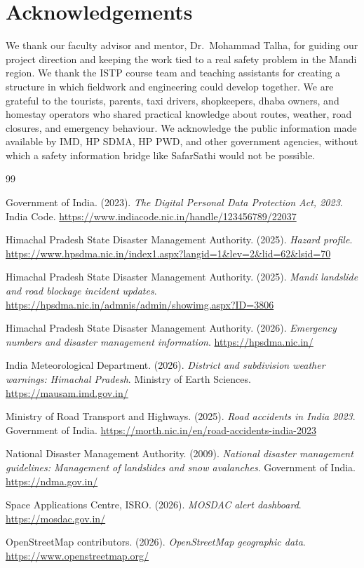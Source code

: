 \documentclass[12pt,a4paper]{article}
\begin{document}
\section*{Acknowledgements}

We thank our faculty advisor and mentor, Dr.\ Mohammad Talha, for guiding our project direction and keeping the work tied to a real safety problem in the Mandi region. We thank the ISTP course team and teaching assistants for creating a structure in which fieldwork and engineering could develop together. We are grateful to the tourists, parents, taxi drivers, shopkeepers, dhaba owners, and homestay operators who shared practical knowledge about routes, weather, road closures, and emergency behaviour. We acknowledge the public information made available by IMD, HP SDMA, HP PWD, and other government agencies, without which a safety information bridge like SafarSathi would not be possible.

\newpage
\begin{thebibliography}{99}

Government of India. (2023). \textit{The Digital Personal Data Protection Act, 2023}. India Code. \url{https://www.indiacode.nic.in/handle/123456789/22037}

Himachal Pradesh State Disaster Management Authority. (2025). \textit{Hazard profile}. \url{https://www.hpsdma.nic.in/index1.aspx?langid=1&lev=2&lid=62&lsid=70}

Himachal Pradesh State Disaster Management Authority. (2025). \textit{Mandi landslide and road blockage incident updates}. \url{https://hpsdma.nic.in/admnis/admin/showimg.aspx?ID=3806}

Himachal Pradesh State Disaster Management Authority. (2026). \textit{Emergency numbers and disaster management information}. \url{https://hpsdma.nic.in/}

India Meteorological Department. (2026). \textit{District and subdivision weather warnings: Himachal Pradesh}. Ministry of Earth Sciences. \url{https://mausam.imd.gov.in/}

Ministry of Road Transport and Highways. (2025). \textit{Road accidents in India 2023}. Government of India. \url{https://morth.nic.in/en/road-accidents-india-2023}

National Disaster Management Authority. (2009). \textit{National disaster management guidelines: Management of landslides and snow avalanches}. Government of India. \url{https://ndma.gov.in/}

Space Applications Centre, ISRO. (2026). \textit{MOSDAC alert dashboard}. \url{https://mosdac.gov.in/}

OpenStreetMap contributors. (2026). \textit{OpenStreetMap geographic data}. \url{https://www.openstreetmap.org/}

\end{thebibliography}
\end{document}
